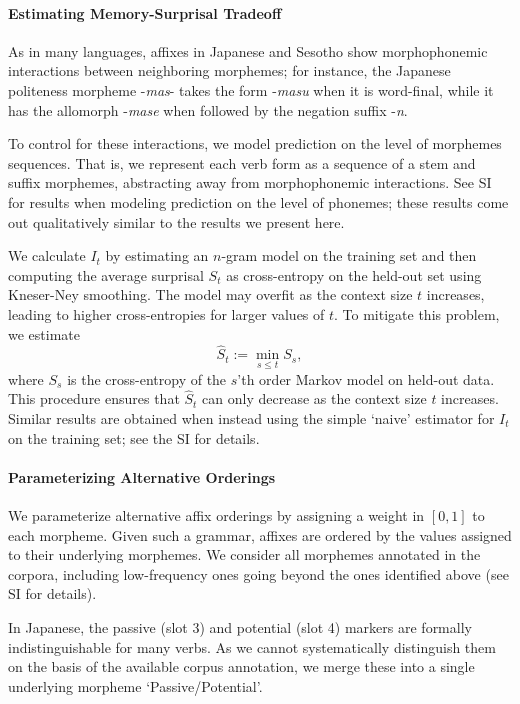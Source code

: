 \paragraph{Estimating Memory-Surprisal Tradeoff}
As in many languages, affixes in Japanese and Sesotho show morphophonemic interactions between neighboring morphemes; for instance, the Japanese politeness morpheme -\textit{mas}- takes the form -\textit{masu} when it is word-final, while it has the allomorph -\textit{mase} when followed by the negation suffix -\textit{n}.

To control for these interactions, we model prediction on the level of morphemes sequences.
That is, we represent each verb form as a sequence of a stem and suffix morphemes, abstracting away from morphophonemic interactions.
See SI for results when modeling prediction on the level of phonemes; these results come out qualitatively similar to the results we present here.

We calculate $I_t$ by estimating an $n$-gram model on the training set and then computing the average surprisal $S_t$ as cross-entropy on the held-out set using Kneser-Ney smoothing.
The model may overfit as the context size $t$ increases, leading to higher cross-entropies for larger values of $t$.
To mitigate this problem, we estimate
\begin{equation}
\hat{S}_t := \min_{s \leq t} S_s,
\end{equation}
where $S_s$ is the cross-entropy of the $s$'th order Markov model on held-out data.
This procedure ensures that $\hat{S}_t$ can only decrease as the context size $t$ increases.
Similar results are obtained when instead using the simple `naive' estimator for $I_t$ on the training set; see the SI for details.

\paragraph{Parameterizing Alternative Orderings}

We parameterize alternative affix orderings by assigning a weight in $[0,1]$ to each morpheme.
Given such a grammar, affixes are ordered by the values assigned to their underlying morphemes.
We consider all morphemes annotated in the corpora, including low-frequency ones going beyond the ones identified above (see SI for details).

In Japanese, the passive (slot 3) and potential (slot 4) markers are formally indistinguishable for many verbs.
As we cannot systematically distinguish them on the basis of the available corpus annotation, we merge these into a single underlying morpheme `Passive/Potential'.


